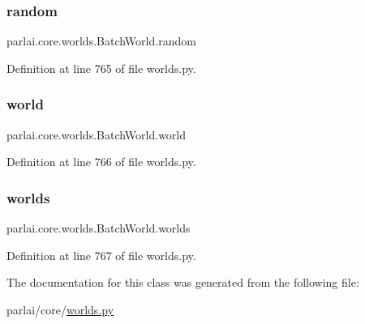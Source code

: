 \subsubsection{\texorpdfstring{random}{random}}
{\footnotesize\ttfamily parlai.\+core.\+worlds.\+Batch\+World.\+random}



Definition at line 765 of file worlds.\+py.

\mbox{\label{classparlai_1_1core_1_1worlds_1_1BatchWorld_ad7d651ac0fb1ee9b52ba7f134602e98e}} 
\subsubsection{\texorpdfstring{world}{world}}
{\footnotesize\ttfamily parlai.\+core.\+worlds.\+Batch\+World.\+world}



Definition at line 766 of file worlds.\+py.

\mbox{\label{classparlai_1_1core_1_1worlds_1_1BatchWorld_ae1b967d3229b90064ff50c1a55dc2b96}} 
\subsubsection{\texorpdfstring{worlds}{worlds}}
{\footnotesize\ttfamily parlai.\+core.\+worlds.\+Batch\+World.\+worlds}



Definition at line 767 of file worlds.\+py.



The documentation for this class was generated from the following file\+:\begin{DoxyCompactItemize}
\item 
parlai/core/\hyperlink{parlai_2core_2worlds_8py}{worlds.\+py}\end{DoxyCompactItemize}
